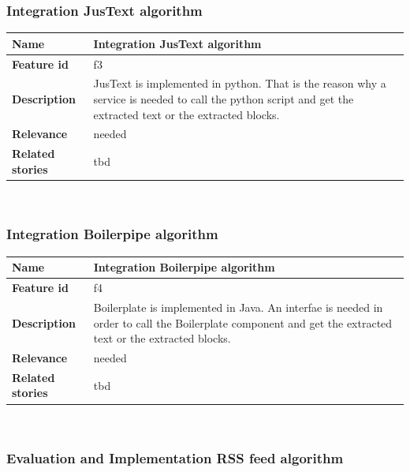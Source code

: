 \subsubsection{Integration JusText algorithm}
\label{subsec:Integration JusText algorithm}

	\begin{tabular}{ | p{3cm} | p{12cm} |}
	\hline
	\textbf{Name} 				& Integration JusText algorithm \\ \hline
	\textbf{Feature id} 		& f3 \\ \hline
	\textbf{Description} 		& JusText is implemented in python. That is the reason why a service is needed to call the python script and get the extracted text or the extracted blocks.\\ \hline
	\textbf{Relevance} 			& needed \\ \hline
	\textbf{Related stories} 	& tbd \\ \hline
	\end{tabular} \\

\subsubsection{Integration Boilerpipe algorithm}
\label{subsec:Integration Boilerpipe algorithm}

	\begin{tabular}{ | p{3cm} | p{12cm} |}
	\hline
	\textbf{Name} 				& Integration Boilerpipe algorithm \\ \hline
	\textbf{Feature id} 		& f4 \\ \hline
	\textbf{Description} 		& Boilerplate is implemented in Java. An interfae is needed in order to call the Boilerplate component and get the extracted text or the extracted blocks.\\ \hline
	\textbf{Relevance} 			& needed \\ \hline
	\textbf{Related stories} 	& tbd \\ \hline
	\end{tabular} \\

\subsubsection{Evaluation and Implementation RSS feed algorithm}
\label{subsec:Evaluation and Implementation RSS feed algorithm}

